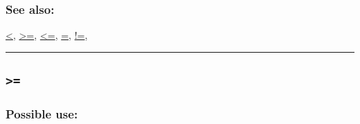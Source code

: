\documentclass[]{book}
\theoremstyle{definition}
\theoremstyle{definition}
\theoremstyle{definition}
\theoremstyle{remark}
\begin{document}
\subsubsection{See also:}\label{see-also-12}

\href{operators-a-to-a.html\#\%3C}{\textless{}},
\href{operators-a-to-a.html\#\%3E=}{\textgreater{}=},
\href{operators-a-to-a.html\#\%3C=}{\textless{}=},
\href{operators-a-to-a.html\#=}{=},
\href{operators-a-to-a.html\#!=}{!=},

\begin{center}\rule{0.5\linewidth}{\linethickness}\end{center}

\subsection{\texorpdfstring{\texttt{\textgreater{}=}}{\textgreater{}=}}\label{section-18}

\subsubsection{Possible use:}\label{possible-use-15}
\end{document}
